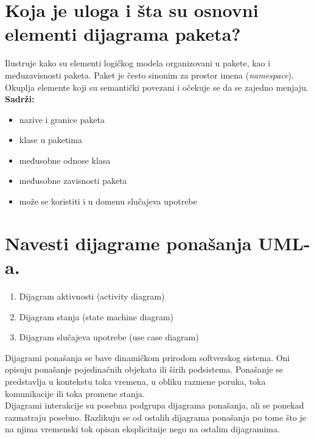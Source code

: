 \documentclass[a4paper]{article}
\begin{document}
\section{Koja je uloga i šta su osnovni elementi dijagrama paketa?}
  Ilustruje kako su elementi logičkog modela organizovani u pakete, kao i međuzavisnosti paketa. 
  Paket je često sinonim za prostor imena (\textit{namespace}). Okuplja elemente koji su semantički 
  povezani i očekuje se da se zajedno menjaju. \\
  \textbf{Sadrži:}
  \begin{itemize}
    \item nazive i granice paketa
    \item klase u paketima
    \item međusobne odnose klasa
    \item međusobne zavisnosti paketa
    \item može se koristiti i u domenu slučajeva upotrebe
  \end{itemize}

\section{Navesti dijagrame ponašanja UML-a.}
  \begin{enumerate}
    \item Dijagram aktivnosti (activity diagram)
    \item Dijagram stanja (state machine diagram)
    \item Dijagram slučajeva upotrebe (use case diagram) 
  \end{enumerate}

    Dijagrami ponašanja se bave dinamičkom prirodom softverskog sistema. Oni
  opisuju ponašanje pojedinačnih objekata ili širih podsistema. Ponašanje se
  predstavlja u kontekstu toka vremena, u obliku razmene poruka, toka komunikacije
  ili toka promene stanja. \\
  \indent Dijagrami interakcije su posebna podgrupa dijagrama ponašanja, ali se ponekad
  razmatraju posebno. Razlikuju se od ostalih dijagrama ponašanja po tome što je na
  njima vremenski tok opisan eksplicitnije nego na ostalim dijagramima.
\end{document}
